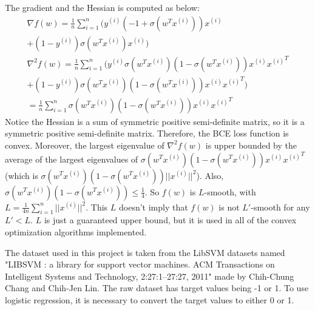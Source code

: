 \documentclass[10pt,conference,compsocconf]{IEEEtran}
\begin{document}
The gradient and the Hessian is computed as below:
\begin{multline}
\nabla f(w) = \frac{1}{n}\sum_{i=1}^n \big( y^{(i)}(-1+\sigma(w^T x^{(i)}))x^{(i)}\\
+(1-y^{(i)})\sigma(w^T x^{(i)})x^{(i)} \big) \\
\nabla^2 f(w) = \frac{1}{n}\sum_{i=1}^n \big( y^{(i)}\sigma(w^T x^{(i)})(1-\sigma(w^T x^{(i)}))x^{(i)}{x^{(i)}}^T\\
+(1-y^{(i)})\sigma(w^T x^{(i)})(1-\sigma(w^T x^{(i)}))x^{(i)}{x^{(i)}}^T \big)\\
= \frac{1}{n}\sum_{i=1}^n \sigma(w^T x^{(i)})(1-\sigma(w^T x^{(i)}))x^{(i)}{x^{(i)}}^T
\end{multline}
Notice the Hessian is a sum of symmetric positive semi-definite matrix, so it is a symmetric positive semi-definite matrix. Therefore, the BCE loss function is convex. Moreover, the largest eigenvalue of $\nabla^2 f(w)$ is upper bounded by the average of the largest eigenvalues of $\sigma(w^T x^{(i)})(1-\sigma(w^T x^{(i)}))x^{(i)}{x^{(i)}}^T$ (which is $\sigma(w^T x^{(i)})(1-\sigma(w^T x^{(i)}))||x^{(i)}||^2$). Also, $\sigma(w^T x^{(i)})(1-\sigma(w^T x^{(i)}))\leq\frac{1}{4}$. So $f(w)$ is $L$-smooth, with $L=\frac{1}{4n}\sum_{i=1}^n ||x^{(i)}||^2$. This $L$ doesn't imply that $f(w)$ is not $L'$-smooth for any $L'<L$. $L$ is just a guaranteed upper bound, but it is used in all of the convex optimization algorithms implemented.\par

The dataset used in this project is taken from the LibSVM datasets named "LIBSVM : a library for support vector machines. ACM Transactions on Intelligent Systems and Technology, 2:27:1--27:27, 2011" made by Chih-Chung Chang and Chih-Jen Lin. The raw dataset has target values being -1 or 1. To use logistic regression, it is necessary to convert the target values to either 0 or 1.\par
\end{document}
